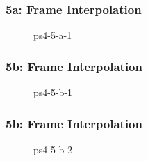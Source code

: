 \documentclass[../report.tex]{subfiles}
\begin{document}
    
    \begin{frame}
        \frametitle{5a: Frame Interpolation}
        \begin{figure}[!htb]
            \centering
            \caption{ps4-5-a-1}
        \end{figure}
    \end{frame}

    \begin{frame}
        \frametitle{5b: Frame Interpolation}
        \begin{figure}[!htb]
            \centering
            \caption{ps4-5-b-1}
        \end{figure}
    \end{frame}

    \begin{frame}
        \frametitle{5b: Frame Interpolation}
        \begin{figure}[!htb]
            \centering
            \caption{ps4-5-b-2}
        \end{figure}
    \end{frame}
\end{document}
